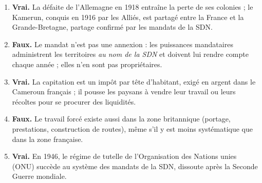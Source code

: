 \documentclass[11pt]{article}
\begin{document}
\begin{corrige}
\begin{enumerate}
\item \textbf{Vrai.} La défaite de l'Allemagne en 1918 entraîne la perte de ses colonies ; le Kamerun, conquis en 1916 par les Alliés, est partagé entre la France et la Grande-Bretagne, partage confirmé par les mandats de la SDN.
\item \textbf{Faux.} Le mandat n'est pas une annexion : les puissances mandataires administrent les territoires \emph{au nom de la SDN} et doivent lui rendre compte chaque année ; elles n'en sont pas propriétaires.
\item \textbf{Vrai.} La capitation est un impôt par tête d'habitant, exigé en argent dans le Cameroun français ; il pousse les paysans à vendre leur travail ou leurs récoltes pour se procurer des liquidités.
\item \textbf{Faux.} Le travail forcé existe aussi dans la zone britannique (portage, prestations, construction de routes), même s'il y est moins systématique que dans la zone française.
\item \textbf{Vrai.} En 1946, le régime de tutelle de l'Organisation des Nations unies (ONU) succède au système des mandats de la SDN, dissoute après la Seconde Guerre mondiale.
\end{enumerate}
\end{corrige}
\end{document}
